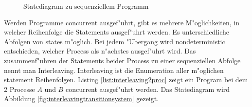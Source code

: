 \documentclass[11pt,twoside,a4paper]{article}
\begin{document}
   
  \label{fig:interleavinglisting}


\begin{figure}
  \centering
  \caption{Statediagram zu sequenziellem Programm}
  \label{fig:sequencielstatediagram}
\end{figure}

Werden Programme concurrent ausgef"uhrt, gibt es mehrere M"oglichkeiten, in welcher Reihenfolge die Statements ausgef"uhrt werden. Es unterschiedliche Abfolgen von states m"oglich. Bei jedem "Ubergang wird nondeterministic entschieden, welcher Process als n"achstes ausgef"uhrt wird. Das zusammenf"uhren der Statements beider Process zu einer sequenziellen Abfolge nennt man Interleaving. Interleaving ist die Enumeration aller m"oglichen statement Reihenfolgen. Listing \ref{list:interleaving2proc} zeigt ein Program bei dem 2 Processe $A$ und $B$ concurrent ausgef"uhrt werden. Das Statediagram wird Abbildung \ref{fig:interleavingtransitionsystem} gezeigt.

  
\end{document}
